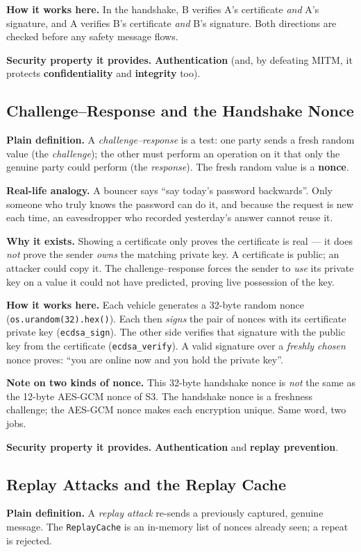 \documentclass[11pt,a4paper]{report}
\begin{document}
\textbf{How it works here.} In the handshake, B verifies A's certificate
\emph{and} A's signature, and A verifies B's certificate \emph{and} B's
signature. Both directions are checked before any safety message flows.

\textbf{Security property it provides.} \textbf{Authentication} (and, by
defeating MITM, it protects \textbf{confidentiality} and \textbf{integrity} too).

\subsection{Challenge--Response and the Handshake Nonce}
\textbf{Plain definition.} A \emph{challenge--response} is a test: one party
sends a fresh random value (the \emph{challenge}); the other must perform an
operation on it that only the genuine party could perform (the \emph{response}).
The fresh random value is a \textbf{nonce}.

\textbf{Real-life analogy.} A bouncer says ``say today's password backwards''.
Only someone who truly knows the password can do it, and because the request is
new each time, an eavesdropper who recorded yesterday's answer cannot reuse it.

\textbf{Why it exists.} Showing a certificate only proves the certificate is
real --- it does \emph{not} prove the sender \emph{owns} the matching private
key. A certificate is public; an attacker could copy it. The challenge--response
forces the sender to \emph{use} its private key on a value it could not have
predicted, proving live possession of the key.

\textbf{How it works here.} Each vehicle generates a 32-byte random nonce
(\texttt{os.urandom(32).hex()}). Each then \emph{signs} the pair of nonces with
its certificate private key (\texttt{ecdsa\_sign}). The other side verifies that
signature with the public key from the certificate (\texttt{ecdsa\_verify}). A
valid signature over a \emph{freshly chosen} nonce proves: ``you are online now
and you hold the private key''.

\textbf{Note on two kinds of nonce.} This 32-byte handshake nonce is \emph{not}
the same as the 12-byte AES-GCM nonce of S3. The handshake nonce is a freshness
challenge; the AES-GCM nonce makes each encryption unique. Same word, two jobs.

\textbf{Security property it provides.} \textbf{Authentication} and
\textbf{replay prevention}.

\subsection{Replay Attacks and the Replay Cache}
\textbf{Plain definition.} A \emph{replay attack} re-sends a previously captured,
genuine message. The \texttt{ReplayCache} is an in-memory list of nonces already
seen; a repeat is rejected.
\end{document}
